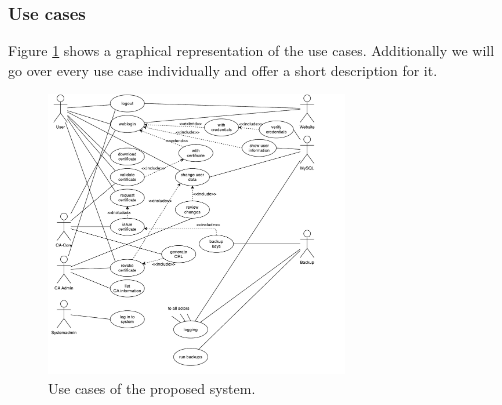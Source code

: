 \documentclass[a4paper, toc=index, 12pt, DIV14, twoside, BCOR2cm, headsepline, numbers=noenddot, bibliography=totoc]{report}
\begin{document}
\subsubsection{Use cases}
Figure \ref{usecase} shows a graphical representation of the use cases. Additionally we will go over every use case individually and offer a short description for it.

\begin{figure}[H]
  \centering
    \includegraphics[width=0.7\textwidth]{images/final_usecases.pdf}  
  \caption{Use cases of the proposed system.}
  \label{usecase}
\end{figure}
\end{document}
